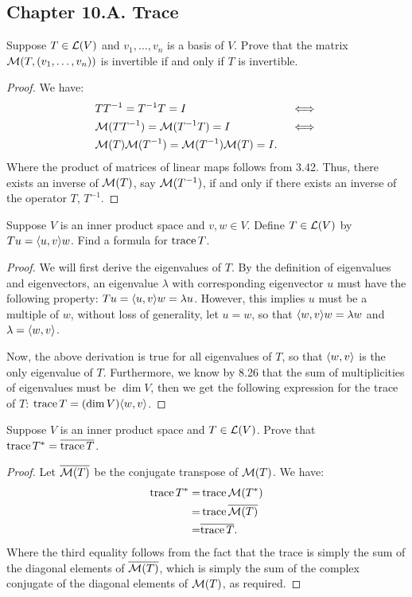 \subsection*{Chapter 10.A. Trace}


\begin{exercise}{1}
  Suppose $T\in\mathcal{L}(V)$ and $v_1,\dots,v_n$ is a basis of $V$. Prove that the matrix $\mathcal{M}(T, (v_1,\dots,v_n))$ is invertible if and only if $T$ is invertible.
\end{exercise}
\begin{proof}
 We have:
 \begin{align*}
     &TT^{-1}=T^{-1}T=I &&\iff\\
     &\mathcal{M}(TT^{-1})=\mathcal{M}(T^{-1}T)=I &&\iff\\
     &\mathcal{M}(T)\mathcal{M}(T^{-1})=\mathcal{M}(T^{-1})\mathcal{M}(T)=I.&&
 \end{align*}
 Where the product of matrices of linear maps follows from 3.42. Thus, there exists an inverse of $\mathcal{M}(T)$, say $\mathcal{M}(T^{-1})$, if and only if there exists an inverse of the operator $T$, $T^{-1}$.
\end{proof}

\begin{exercise}{8}
  Suppose $V$ is an inner product space and $v,w\in V$. Define $T\in\mathcal{L}(V)$ by $Tu=\langle u,v\rangle w$. Find a formula for $\operatorname*{trace} T$.
\end{exercise}
\begin{proof}
 We will first derive the eigenvalues of $T$. By the definition of eigenvalues and eigenvectors, an eigenvalue $\lambda$ with corresponding eigenvector $u$ must have the following property: $Tu =\langle u,v\rangle w =\lambda u$. However, this implies $u$ must be a multiple of $w$, without loss of generality, let $u=w$, so that $\langle w,v\rangle w=\lambda w$ and $\lambda=\langle w,v\rangle$. 
 
 Now, the above derivation is true for all eigenvalues of $T$, so that $\langle w,v\rangle$ is the only eigenvalue of $T$. Furthermore, we know by 8.26 that the sum of multiplicities of eigenvalues must be $\dim V$, then we get the following expression for the trace of $T$: $\operatorname*{trace} T=(\dim V)\langle w,v\rangle$.
\end{proof}

\begin{exercise}{10}
  Suppose $V$ is an inner product space and $T\in\mathcal{L}(V)$. Prove that $\operatorname*{trace} T^\ast =\overline{\operatorname*{trace} T}$.
\end{exercise}
\begin{proof}
 Let $\overline{\mathcal{M}(T)}$ be the conjugate transpose of $\mathcal{M}(T)$. We have:
 \begin{align*}
     \operatorname*{trace} T^\ast =& \operatorname*{trace}\mathcal{M}(T^\ast)\\
     =& \operatorname*{trace}\overline{\mathcal{M}(T)}\\
     =& \overline{\operatorname*{trace} T}.
 \end{align*}
 Where the third equality follows from the fact that the trace is simply the sum of the diagonal elements of $\overline{\mathcal{M}(T)}$, which is simply the sum of the complex conjugate of the diagonal elements of $\mathcal{M}(T)$, as required.
\end{proof}

